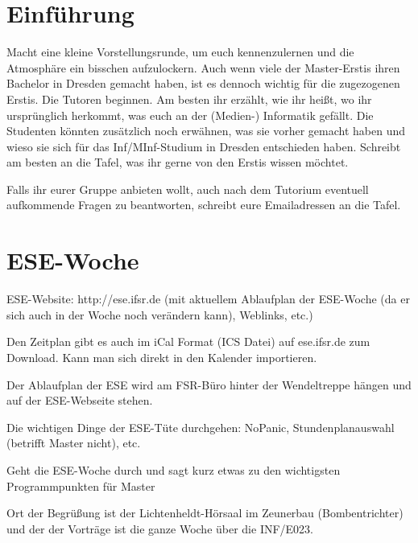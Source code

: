 \documentclass[a4paper,12pt]{report}
\begin{document}
\section{Einführung}
\begin{itemize*}
\item Macht eine kleine Vorstellungsrunde, um euch kennenzulernen und die Atmosphäre ein bisschen aufzulockern. Auch wenn viele der Master-Erstis ihren Bachelor in Dresden gemacht haben, ist es dennoch wichtig für die zugezogenen Erstis.
Die Tutoren beginnen.
Am besten ihr erzählt, wie ihr heißt, wo ihr ursprünglich herkommt, was euch an der (Medien-) Informatik gefällt. 
Die Studenten könnten zusätzlich noch erwähnen, was sie vorher gemacht haben und wieso sie sich für das Inf/MInf-Studium in Dresden entschieden haben.
Schreibt am besten an die Tafel, was ihr gerne von den Erstis wissen möchtet.
\item Falls ihr eurer Gruppe anbieten wollt, auch nach dem Tutorium eventuell aufkommende Fragen zu beantworten, schreibt eure Emailadressen an die Tafel.
\end{itemize*}

\section{ESE-Woche}
\begin{itemize*}
\item ESE-Website: http://ese.ifsr.de (mit aktuellem Ablaufplan der ESE-Woche (da er sich auch in der Woche noch verändern kann), Weblinks, etc.)
\item Den Zeitplan gibt es auch im iCal Format (ICS Datei) auf ese.ifsr.de zum Download.
Kann man sich direkt in den Kalender importieren.
\item Der Ablaufplan der ESE wird am FSR-Büro hinter der Wendeltreppe hängen und auf der ESE-Webseite stehen.
\item Die wichtigen Dinge der ESE-Tüte durchgehen: NoPanic, Stundenplanauswahl (betrifft Master nicht), etc.
\item Geht die ESE-Woche durch und sagt kurz etwas zu den wichtigsten Programmpunkten für Master
\end{itemize*}
\vspace{0.5cm}
Ort der Begrüßung ist der Lichtenheldt-Hörsaal im Zeunerbau (Bombentrichter) und der der Vorträge ist die ganze Woche über die INF/E023.
\end{document}
